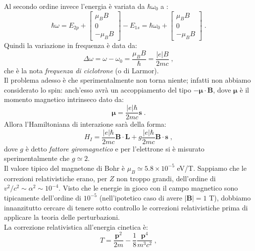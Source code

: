 \documentclass[12pt,a4paper]{report}
\theoremstyle{definition}
\numberwithin{equation}{section}
\begin{document}
Al secondo ordine invece l'energia è variata da $\hbar\omega_0$ a :
\begin{equation}
\hbar \omega=E_{2p}+\left[
\begin{matrix}
\mu_BB \\
0 \\
-\mu_BB
\end{matrix}\right]-E_{1s}=\hbar\omega_0+\left[
\begin{matrix}
\mu_BB \\
0 \\
-\mu_BB
\end{matrix}\right]\;.
\end{equation}
Quindi la variazione in frequenza è data da:
\begin{equation}
\Delta\omega=\omega-\omega_0=\frac{\mu_BB}{\hbar}=\frac{|e|B}{2mc}\;,
\end{equation}
che è la nota \textit{frequenza di ciclotrone} (o di Larmor). \\
Il problema adesso è che sperimentalmente non torna niente; infatti non abbiamo considerato lo spin: anch'esso avrà un accoppiamento del tipo $-\boldsymbol{\mu}\cdot\mathbf{B}$, dove $\boldsymbol{\mu}$ è il momento magnetico intrinseco dato da:
\begin{equation}
\boldsymbol{\mu}=\frac{|e|\hbar}{2mc}\mathbf{s}\;.
\end{equation}
Allora l'Hamiltoniana di interazione sarà della forma:
\begin{equation}
H_I=\frac{|e|\hbar}{2mc}\mathbf{B}\cdot\mathbf{L}+g\frac{|e|\hbar}{2mc}\mathbf{B}\cdot\mathbf{s}\;,
\end{equation}
dove $g$ è detto \textit{fattore giromagnetico} e per l'elettrone si è misurato sperimentalmente che $g\simeq 2$. \\
Il valore tipico del magnetone di Bohr è $\mu_B\simeq 5.8\times 10^{-5}$ eV/T. Sappiamo che le correzioni relativistiche erano, per $Z$ non troppo grandi, dell'ordine di $v^2/c^2\sim \alpha^2\sim 10^{-4}$. Visto che le energie in gioco con il campo magnetico sono tipicamente dell'ordine di $10^{-5}$ (nell'ipotetico caso di avere $|\mathbf{B}|=1$ T), dobbiamo innanzitutto cercare di tenere sotto controllo le correzioni relativistiche prima di applicare la teoria delle perturbazioni. \\
La correzione relativistica all'energia cinetica è:
\begin{equation}
T=\frac{\mathbf{p}^2}{2m}-\frac{1}{8}\frac{\mathbf{p}^4}{m^3c^2}\;,
\end{equation}
\end{document}
